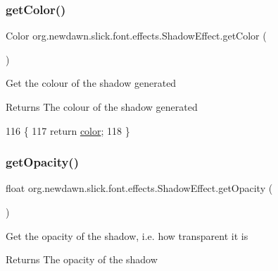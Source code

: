 \subsubsection{\texorpdfstring{get\+Color()}{getColor()}}
{\footnotesize\ttfamily Color org.\+newdawn.\+slick.\+font.\+effects.\+Shadow\+Effect.\+get\+Color (\begin{DoxyParamCaption}{ }\end{DoxyParamCaption})\hspace{0.3cm}{\ttfamily [inline]}}

Get the colour of the shadow generated

\begin{DoxyReturn}{Returns}
The colour of the shadow generated 
\end{DoxyReturn}

\begin{DoxyCode}
116                             \{
117         \textcolor{keywordflow}{return} \mbox{\hyperlink{classorg_1_1newdawn_1_1slick_1_1font_1_1effects_1_1_shadow_effect_a4a5a1c31b38b33b042cadabe1593bc62}{color}};
118     \}
\end{DoxyCode}
\mbox{\label{classorg_1_1newdawn_1_1slick_1_1font_1_1effects_1_1_shadow_effect_a4f89903cf92e57a47da66104954e751b}} 
\subsubsection{\texorpdfstring{get\+Opacity()}{getOpacity()}}
{\footnotesize\ttfamily float org.\+newdawn.\+slick.\+font.\+effects.\+Shadow\+Effect.\+get\+Opacity (\begin{DoxyParamCaption}{ }\end{DoxyParamCaption})\hspace{0.3cm}{\ttfamily [inline]}}

Get the opacity of the shadow, i.\+e. how transparent it is

\begin{DoxyReturn}{Returns}
The opacity of the shadow 
\end{DoxyReturn}

